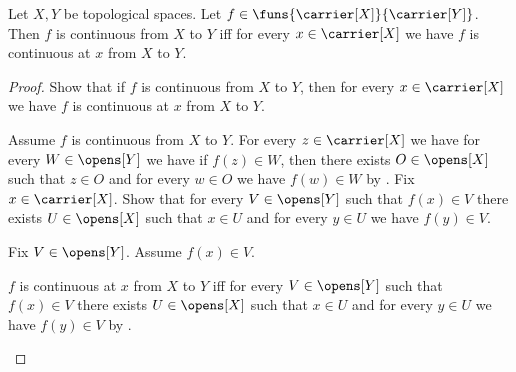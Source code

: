 \begin{theorem}\label{continuous_iff_continuous_at_every_point}
    Let $X,Y$ be topological spaces.
    Let $f\in\funs{\carrier[X]}{\carrier[Y]}$.
    Then $f$ is continuous from $X$ to $Y$ iff
        for every $x\in\carrier[X]$ we have
        $f$ is continuous at $x$ from $X$ to $Y$.
\end{theorem}
\begin{proof}
    Show that if $f$ is continuous from $X$ to $Y$, then
        for every $x\in\carrier[X]$ we have
        $f$ is continuous at $x$ from $X$ to $Y$.
    \begin{subproof}
        Assume $f$ is continuous from $X$ to $Y$.
        For every $z\in\carrier[X]$ we have
            for every $W\in\opens[Y]$ we have if $f(z)\in W$, then
            there exists $O\in\opens[X]$ such that $z\in O$ and
                for every $w\in O$ we have $f(w)\in W$ by
            .
        Fix $x\in\carrier[X]$.
        Show that for every $V\in\opens[Y]$ such that $f(x)\in V$ there
            exists $U\in\opens[X]$ such that $x\in U$ and
            for every $y\in U$ we have $f(y)\in V$.
        \begin{subproof}
            Fix $V\in\opens[Y]$.
            Assume $f(x)\in V$.
        \end{subproof}
        $f$ is continuous at $x$ from $X$ to $Y$ iff
            for every $V\in\opens[Y]$ such that $f(x)\in V$ there exists
            $U\in\opens[X]$ such that $x\in U$ and
            for every $y\in U$ we have $f(y)\in V$ by
            .
    \end{subproof}


\end{proof}
